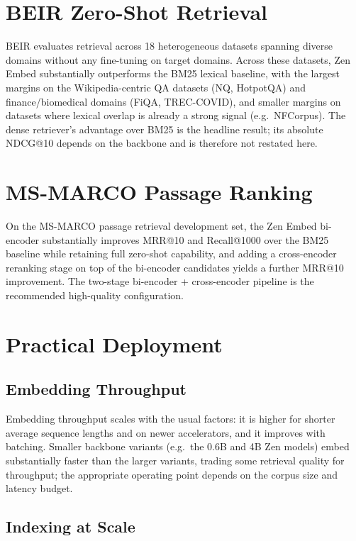 \documentclass[11pt,a4paper]{article}
\begin{document}
\section{BEIR Zero-Shot Retrieval}

BEIR evaluates retrieval across 18 heterogeneous datasets spanning diverse domains without
any fine-tuning on target domains. Across these datasets, Zen Embed substantially
outperforms the BM25 lexical baseline, with the largest margins on the Wikipedia-centric
QA datasets (NQ, HotpotQA) and finance/biomedical domains (FiQA, TREC-COVID), and smaller
margins on datasets where lexical overlap is already a strong signal (e.g.\ NFCorpus). The
dense retriever's advantage over BM25 is the headline result; its absolute NDCG@10
depends on the backbone and is therefore not restated here.

\section{MS-MARCO Passage Ranking}

On the MS-MARCO passage retrieval development set, the Zen Embed bi-encoder substantially
improves MRR@10 and Recall@1000 over the BM25 baseline while retaining full zero-shot
capability, and adding a cross-encoder reranking stage on top of the bi-encoder candidates
yields a further MRR@10 improvement. The two-stage bi-encoder + cross-encoder pipeline is
the recommended high-quality configuration.

\section{Practical Deployment}

\subsection{Embedding Throughput}

Embedding throughput scales with the usual factors: it is higher for shorter average
sequence lengths and on newer accelerators, and it improves with batching. Smaller
backbone variants (e.g.\ the 0.6B and 4B Zen models) embed substantially faster than the
larger variants, trading some retrieval quality for throughput; the appropriate operating
point depends on the corpus size and latency budget.

\subsection{Indexing at Scale}
\end{document}
